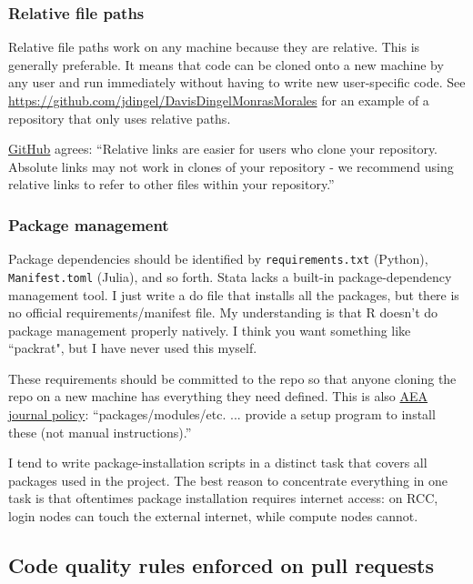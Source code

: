\subsubsection{Relative file paths}

Relative file paths work on any machine because they are relative.
This is generally preferable.
It means that code can be cloned onto a new machine by any user and run immediately without having to write new user-specific code.
See \url{https://github.com/jdingel/DavisDingelMonrasMorales} for an example of a repository that only uses relative paths.

\href{https://help.github.com/articles/about-readmes/\#relative-links-and-image-paths-in-readme-files}{GitHub} agrees:
``Relative links are easier for users who clone your repository. Absolute links may not work in clones of your repository - we recommend using relative links to refer to other files within your repository.''

\subsubsection{Package management}

Package dependencies should be identified by \texttt{requirements.txt} (Python), \texttt{Manifest.toml} (Julia), and so forth.
Stata lacks a built-in package-dependency management tool.
I just write a do file that installs all the packages, but there is no official requirements/manifest file.
My understanding is that R doesn't do package management properly natively.
I think you want something like ``packrat", but I have never used this myself.

These requirements should be committed to the repo so that anyone cloning the repo on a new machine has everything they need defined.
This is also \href{https://aeadataeditor.github.io/aea-de-guidance/preparing-for-data-deposit.html}{AEA journal policy}:
``packages/modules/etc. ... provide a setup program to install these (not manual instructions).''

I tend to write package-installation scripts in a distinct task that covers all packages used in the project.
The best reason to concentrate everything in one task is that oftentimes package installation requires internet access:
on RCC, login nodes can touch the external internet, while compute nodes cannot.

\subsection{Code quality rules enforced on pull requests}

